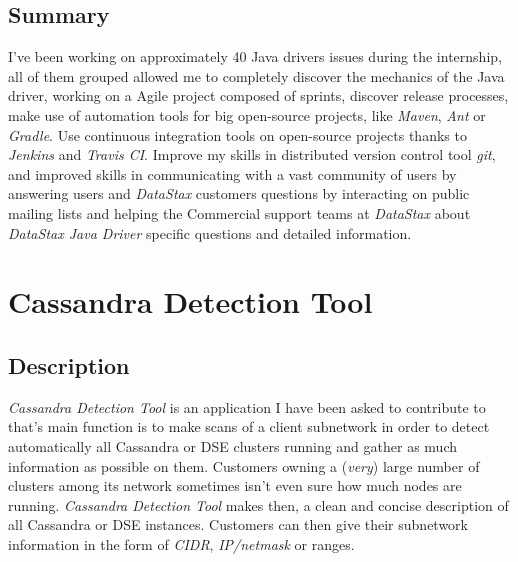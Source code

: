 \documentclass[a4paper]{report}
\newcommand{\ds}{\emph{DataStax\xspace}}
\newcommand{\djd}{\emph{DataStax Java Driver\xspace}}
\begin{document}
\section{Summary}
I've been working on approximately 40 Java drivers issues during the internship, all of them grouped allowed me to completely discover the mechanics of the Java driver, working on a Agile project composed of sprints, discover release processes, make use of automation tools for big open-source projects, like \emph{Maven}, \emph{Ant} or \emph{Gradle}. Use continuous integration tools on open-source projects thanks to \emph{Jenkins} and \emph{Travis CI}. Improve my skills in distributed version control tool \emph{git}, and improved skills in communicating with a vast community of users by answering users and \ds{} customers questions by interacting on public mailing lists and helping the Commercial support teams at \ds{} about \djd{} specific questions and detailed information.




\chapter{Cassandra Detection Tool}

\section{Description}
\emph{Cassandra Detection Tool} is an application I have been asked to contribute to that's main function is to make scans of a client subnetwork in order to detect automatically all Cassandra or DSE clusters running and gather as much information as possible on them. Customers owning a (\emph{very}) large number of clusters among its network sometimes isn't even sure how much nodes are running. \emph{Cassandra Detection Tool} makes then, a clean and concise description of all Cassandra or DSE instances. Customers can then give their subnetwork information in the form of \emph{CIDR}, \emph{IP/netmask} or ranges.
\end{document}
